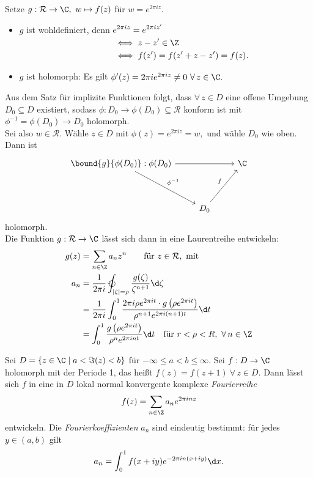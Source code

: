 		Setze $ g: \mathcal{R} \to \C,\ w \mapsto f(z) $ für $ w = e^{2\pi iz} $.
		\begin{itemize}
			\item $g$ ist wohldefiniert, denn $ \begin{aligned}[t]
			&e^{2\pi iz} = e^{2\pi iz'} \\
			&\iff z - z' \in \Z \\
			&\iff f(z') = f(z' + z-z') = f(z).
			\end{aligned} $
			\item $g$ ist holomorph: Es gilt $ \phi'(z) = 2\pi i e^{2\pi iz} \neq 0\ \forall\, z \in \C. $
		\end{itemize}
		Aus dem Satz für implizite Funktionen folgt, dass $ \forall\, z \in D $ eine offene Umgebung $ D_0 \subseteq D $ existiert, sodass $ \phi: D_0 \to \phi(D_0) \subseteq \mathcal{R} $ konform ist mit $ \phi^{-1} = \phi(D_0) \to D_0 $ holomorph.\\
		Sei also $ w \in \mathcal{R}. $ Wähle $ z \in D $ mit $ \phi(z) = e^{2\pi iz} = w, $ und wähle $D_0$ wie oben. Dann ist
		$$\begin{tikzcd}
			\bound{g}{\phi(D_0)}:\phi(D_0)\arrow{rr}\arrow{ddr}{\phi^{-1}} & & \C\\
			&&\\
			&D_0 \arrow{uur}{f}
		\end{tikzcd}$$
		holomorph.\\
		Die Funktion $ g: \mathcal{R} \to \C $ lässt sich dann in eine Laurentreihe entwickeln:
		\begin{align*}
			g(z) &= \sum_{n \in \Z} a_nz^n\qquad \text{für } z \in \mathcal{R},\ \text{mit}\\
			a_n &= \frac{1}{2\pi i} \varointctrclockwise_{|\zeta| = \rho} \frac{g(\zeta)}{\zeta^{n+1}}\d\zeta\\
			&= \frac{1}{2\pi i} \int_0^1 \frac{2\pi i \rho e^{2\pi it} \cdot g\left(\rho e^{2\pi it}\right)}{\rho^{n+1} e^{2\pi i(n+1)t}} \d t\\
			&= \int_0^1 \frac{g\left( \rho e^{2\pi it} \right)}{\rho^n e^{2\pi int}} \d t \quad \text{für } r<\rho<R,\ \forall\, n \in \Z
		\end{align*}
		
		\begin{thmn}[Fourierentwicklung]
			Sei $ D = \{ z \in \C \mid  a < \Im(z) < b \} $ für $ -\infty \leq a < b \leq \infty $. Sei $ f: D \to \C $ holomorph mit der Periode 1, das heißt $ f(z) = f(z+1)\ \forall \, z \in D. $ Dann lässt sich $f$ in eine in $D$ lokal normal konvergente komplexe \emph{Fourierreihe} 
			\[ f(z) = \sum_{n \in \Z} a_n e^{2\pi inz} \]
			entwickeln. Die \emph{Fourierkoeffizienten} $a_n$ sind eindeutig bestimmt: für jedes $ y \in (a,b) $ gilt
			\[ a_n = \int_0^1 f(x+iy)e^{-2\pi in(x+iy)} \d x. \]
		\end{thmn}